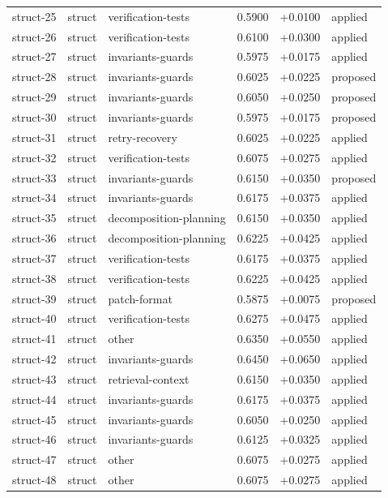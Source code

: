 \begin{center}
\begin{longtable}{llp{5.2cm}rrl}
struct-25 & struct & verification-tests & 0.5900 & +0.0100 & applied \\
struct-26 & struct & verification-tests & 0.6100 & +0.0300 & applied \\
struct-27 & struct & invariants-guards & 0.5975 & +0.0175 & applied \\
struct-28 & struct & invariants-guards & 0.6025 & +0.0225 & proposed \\
struct-29 & struct & invariants-guards & 0.6050 & +0.0250 & proposed \\
struct-30 & struct & invariants-guards & 0.5975 & +0.0175 & proposed \\
struct-31 & struct & retry-recovery & 0.6025 & +0.0225 & applied \\
struct-32 & struct & verification-tests & 0.6075 & +0.0275 & applied \\
struct-33 & struct & invariants-guards & 0.6150 & +0.0350 & proposed \\
struct-34 & struct & invariants-guards & 0.6175 & +0.0375 & applied \\
struct-35 & struct & decomposition-planning & 0.6150 & +0.0350 & applied \\
struct-36 & struct & decomposition-planning & 0.6225 & +0.0425 & applied \\
struct-37 & struct & verification-tests & 0.6175 & +0.0375 & applied \\
struct-38 & struct & verification-tests & 0.6225 & +0.0425 & applied \\
struct-39 & struct & patch-format & 0.5875 & +0.0075 & proposed \\
struct-40 & struct & verification-tests & 0.6275 & +0.0475 & applied \\
struct-41 & struct & other & 0.6350 & +0.0550 & applied \\
struct-42 & struct & invariants-guards & 0.6450 & +0.0650 & applied \\
struct-43 & struct & retrieval-context & 0.6150 & +0.0350 & applied \\
struct-44 & struct & invariants-guards & 0.6175 & +0.0375 & applied \\
struct-45 & struct & invariants-guards & 0.6050 & +0.0250 & applied \\
struct-46 & struct & invariants-guards & 0.6125 & +0.0325 & applied \\
struct-47 & struct & other & 0.6075 & +0.0275 & applied \\
struct-48 & struct & other & 0.6075 & +0.0275 & applied \\

\end{longtable}
\end{center}
